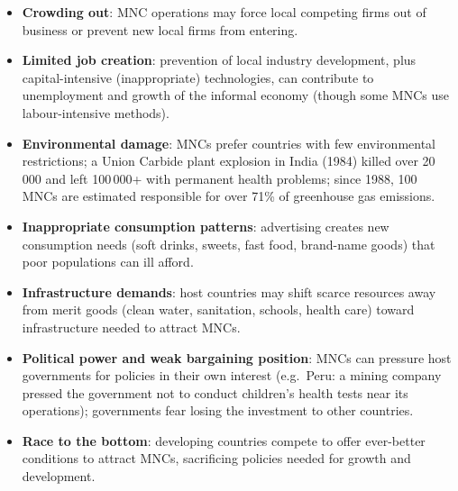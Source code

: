 \documentclass[a4paper,12pt]{article}
\begin{document}
\begin{itemize}
\begin{itemize}
    \item \textbf{Crowding out}: MNC operations may force local competing firms out of business or prevent new local firms from entering.
    \item \textbf{Limited job creation}: prevention of local industry development, plus capital-intensive (inappropriate) technologies, can contribute to unemployment and growth of the informal economy (though some MNCs use labour-intensive methods).
    \item \textbf{Environmental damage}: MNCs prefer countries with few environmental restrictions; a Union Carbide plant explosion in India (1984) killed over 20\,000 and left 100\,000+ with permanent health problems; since 1988, 100 MNCs are estimated responsible for over 71\% of greenhouse gas emissions.
    \item \textbf{Inappropriate consumption patterns}: advertising creates new consumption needs (soft drinks, sweets, fast food, brand-name goods) that poor populations can ill afford.
    \item \textbf{Infrastructure demands}: host countries may shift scarce resources away from merit goods (clean water, sanitation, schools, health care) toward infrastructure needed to attract MNCs.
    \item \textbf{Political power and weak bargaining position}: MNCs can pressure host governments for policies in their own interest (e.g.\ Peru: a mining company pressed the government not to conduct children's health tests near its operations); governments fear losing the investment to other countries.
    \item \textbf{Race to the bottom}: developing countries compete to offer ever-better conditions to attract MNCs, sacrificing policies needed for growth and development.
  \end{itemize}
\end{itemize}
\end{document}
